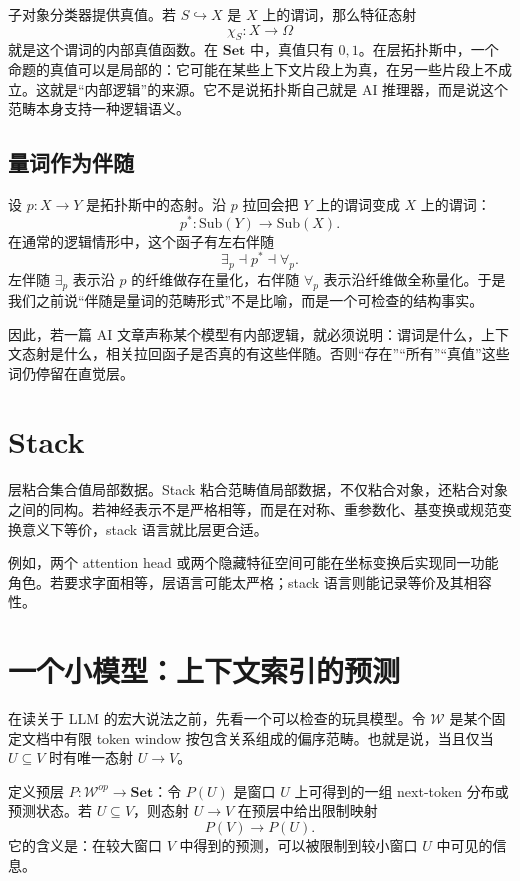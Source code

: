 \documentclass[UTF8,11pt,fontset=none]{ctexart}
\newcommand{\Set}{\mathbf{Set}}
\newcommand{\Sub}{\mathrm{Sub}}
\begin{document}
子对象分类器提供真值。若 \(S\hookrightarrow X\) 是 \(X\) 上的谓词，那么特征态射
\[
\chi_S:X\to\Omega
\]
就是这个谓词的内部真值函数。在 \(\Set\) 中，真值只有 \(0,1\)。在层拓扑斯中，一个命题的真值可以是局部的：它可能在某些上下文片段上为真，在另一些片段上不成立。这就是“内部逻辑”的来源。它不是说拓扑斯自己就是 AI 推理器，而是说这个范畴本身支持一种逻辑语义。

\subsection{量词作为伴随}

设 \(p:X\to Y\) 是拓扑斯中的态射。沿 \(p\) 拉回会把 \(Y\) 上的谓词变成 \(X\) 上的谓词：
\[
p^\ast:\Sub(Y)\longrightarrow \Sub(X).
\]
在通常的逻辑情形中，这个函子有左右伴随
\[
\exists_p\dashv p^\ast \dashv \forall_p .
\]
左伴随 \(\exists_p\) 表示沿 \(p\) 的纤维做存在量化，右伴随 \(\forall_p\) 表示沿纤维做全称量化。于是我们之前说“伴随是量词的范畴形式”不是比喻，而是一个可检查的结构事实。

因此，若一篇 AI 文章声称某个模型有内部逻辑，就必须说明：谓词是什么，上下文态射是什么，相关拉回函子是否真的有这些伴随。否则“存在”“所有”“真值”这些词仍停留在直觉层。

\section{Stack}

层粘合集合值局部数据。Stack 粘合范畴值局部数据，不仅粘合对象，还粘合对象之间的同构。若神经表示不是严格相等，而是在对称、重参数化、基变换或规范变换意义下等价，stack 语言就比层更合适。

例如，两个 attention head 或两个隐藏特征空间可能在坐标变换后实现同一功能角色。若要求字面相等，层语言可能太严格；stack 语言则能记录等价及其相容性。

\section{一个小模型：上下文索引的预测}

在读关于 LLM 的宏大说法之前，先看一个可以检查的玩具模型。令 \(\mathcal W\) 是某个固定文档中有限 token window 按包含关系组成的偏序范畴。也就是说，当且仅当 \(U\subseteq V\) 时有唯一态射 \(U\to V\)。

定义预层 \(P:\mathcal W^{op}\to\Set\)：令 \(P(U)\) 是窗口 \(U\) 上可得到的一组 next-token 分布或预测状态。若 \(U\subseteq V\)，则态射 \(U\to V\) 在预层中给出限制映射
\[
P(V)\longrightarrow P(U).
\]
它的含义是：在较大窗口 \(V\) 中得到的预测，可以被限制到较小窗口 \(U\) 中可见的信息。
\end{document}
